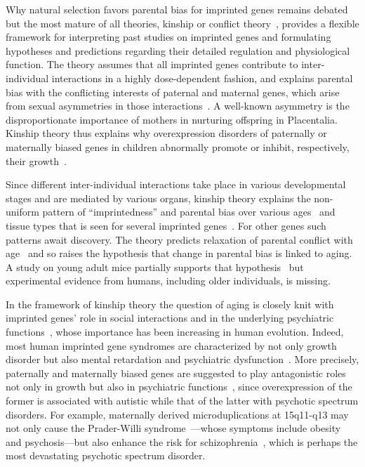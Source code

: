 \documentclass[letterpaper]{article}
\begin{document}
Why natural selection favors parental bias for imprinted genes remains
debated~\cite{Wilkins2003,McDonald2005,Keverne2015} but the most mature of all
theories, kinship or conflict theory~\cite{Wilkins2003}, provides a flexible
framework for interpreting past studies on imprinted genes and formulating
hypotheses and predictions regarding their detailed regulation and
physiological function.  The theory assumes that all imprinted genes contribute to
inter-individual interactions in a highly dose-dependent fashion, and explains
parental bias with the conflicting interests of paternal and maternal genes,
which arise from sexual asymmetries in those interactions~\cite{Wilkins2003}.
A well-known asymmetry is the disproportionate importance of mothers in
nurturing offspring in Placentalia.  Kinship theory thus explains why
overexpression disorders of paternally or maternally biased genes in children
abnormally promote or inhibit, respectively, their
growth~\cite{Plasschaert2014,Peters2014}.

Since different inter-individual interactions take place in various
developmental stages and are mediated by various organs, kinship theory
explains the non-uniform pattern of ``imprintedness'' and parental bias over
various ages~\cite{Bourke2007} and tissue types that is seen for several
imprinted genes~\cite{Plasschaert2014,Peters2014}.  For other genes such
patterns await discovery.  The theory predicts relaxation of parental conflict
with age~\cite{Ubeda2012} and so raises the hypothesis that change in parental
bias is linked to aging.  A study on young adult mice partially supports that
hypothesis~\cite{Perez2015} but experimental evidence from humans, including
older individuals, is missing.

In the framework of kinship theory the question of aging is closely knit with
imprinted genes' role in social interactions and in the underlying psychiatric
functions~\cite{Ubeda2012,Wilkins2003}, whose importance has been increasing
in human evolution.  Indeed, most human imprinted gene syndromes are
characterized by not only growth disorder but also mental retardation and
psychiatric dysfunction~\cite{Plasschaert2014,Peters2014}.  More precisely,
paternally and maternally biased genes are suggested to play antagonistic
roles not only in growth but also in psychiatric functions~\cite{Crespi2008a},
since overexpression of the former is associated with autistic while that of the
latter with psychotic spectrum disorders.  For example, maternally derived
microduplications at 15q11-q13 may not only cause the Prader-Willi
syndrome~\cite{Peters2014}---whose symptoms include obesity and
psychosis---but also enhance the risk for
schizophrenia~\cite{Ingason2011,Sullivan2012}, which is perhaps the most
devastating psychotic spectrum disorder.
\end{document}
